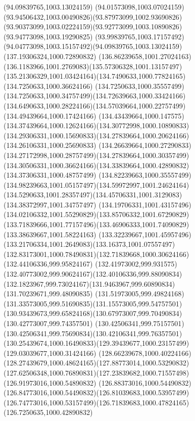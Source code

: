 {    \moveto(94.09839765,1003.13024159)
    \curveto(94.01573098,1003.07024159)(93.94506432,1003.00490826)(93.87973099,1002.93690826)
    \curveto(93.90373099,1003.02224159)(93.92773099,1003.10890826)(93.94773098,1003.19290825)
    \curveto(93.99839765,1003.17157492)(94.04773098,1003.15157492)(94.09839765,1003.13024159)
    \moveto(137.19306324,1000.72890832)
    \curveto(136.86239658,1001.27024163)(136.1183966,1001.2769083)(135.57306328,1001.13157497)
    \curveto(135.21306329,1001.03424164)(134.7490633,1000.77824165)(134.7250633,1000.36624166)
    \curveto(134.7250633,1000.35557499)(134.7250633,1000.34757499)(134.72639663,1000.33424166)
    \curveto(134.6490633,1000.28224166)(134.57039664,1000.22757499)(134.49439664,1000.17424166)
    \curveto(134.43439664,1000.147575)(134.37439664,1000.12624166)(134.30772998,1000.10890833)
    \curveto(134.29306331,1000.15690833)(134.27839664,1000.20624166)(134.26106331,1000.25690833)
    \curveto(134.26639664,1000.27290833)(134.27172998,1000.28757499)(134.27839664,1000.30357499)
    \curveto(134.30506331,1000.36624166)(134.33839664,1000.42890832)(134.37306331,1000.48757499)
    \curveto(134.82239663,1000.35557499)(134.98239663,1001.05157497)(134.59972997,1001.24624164)
    \curveto(134.5290633,1001.28357497)(134.45706331,1001.3129083)(134.38372997,1001.34757497)
    \curveto(134.19706331,1001.43157496)(134.02106332,1001.55290829)(133.85706332,1001.67290829)
    \curveto(133.71839666,1001.77157496)(133.46906333,1001.74090829)(133.38639667,1001.58224163)
    \curveto(133.32239667,1001.45957496)(133.21706334,1001.2649083)(133.16373,1001.07557497)
    \curveto(132.83173001,1000.78490831)(132.71839668,1000.30624166)(132.44106336,999.95824167)
    \curveto(132.41973002,999.931575)(132.40773002,999.90624167)(132.40106336,999.88090834)
    \curveto(132.1823967,999.73024167)(131.9463967,999.60890834)(131.70239671,999.48090835)
    \curveto(131.51973005,999.49824168)(131.33573005,999.51690835)(131.15573005,999.54757501)
    \curveto(130.93439673,999.65824168)(130.67973007,999.70490834)(130.42773007,999.74357501)
    \curveto(130.42506341,999.75157501)(130.42506341,999.75690834)(130.42106341,999.76357501)
    \curveto(130.25439674,1000.16490833)(129.39439677,1000.23157499)(129.03039677,1000.31424166)
    \curveto(128.66239678,1000.40224166)(128.27439679,1000.48624165)(127.88773014,1000.53290832)
    \curveto(127.62506348,1000.76890831)(127.23839682,1000.71557498)(126.91973016,1000.54890832)
    \curveto(126.88373016,1000.54490832)(126.84773016,1000.54490832)(126.81039683,1000.53957499)
    \curveto(126.74773016,1000.53157499)(126.71839683,1000.47824165)(126.7250635,1000.42890832)
}
